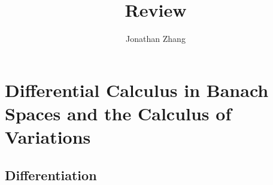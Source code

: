 \documentclass[letterpaper,twoside,12pt]{article}
\theoremstyle{mystyle}
\newtheorem{theorem}{Theorem}[section]
\newcommand{\ScS}{\mathcal S}
\begin{document}
\title{\vspace{-2\baselineskip} 
Review
}
\author{Jonathan Zhang}
\date{}
\maketitle

%    

\section{Differential Calculus in Banach Spaces and the Calculus of Variations}
\subsection{Differentiation}
\end{document}
